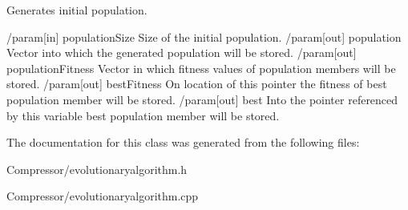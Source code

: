 Generates initial population. 

/param\mbox{[}in\mbox{]} population\+Size Size of the initial population. /param\mbox{[}out\mbox{]} population Vector into which the generated population will be stored. /param\mbox{[}out\mbox{]} population\+Fitness Vector in which fitness values of population members will be stored. /param\mbox{[}out\mbox{]} best\+Fitness On location of this pointer the fitness of best population member will be stored. /param\mbox{[}out\mbox{]} best Into the pointer referenced by this variable best population member will be stored. 

The documentation for this class was generated from the following files\+:\begin{DoxyCompactItemize}
\item 
Compressor/evolutionaryalgorithm.\+h\item 
Compressor/evolutionaryalgorithm.\+cpp\end{DoxyCompactItemize}
